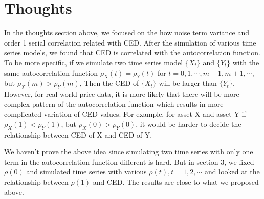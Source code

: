 \documentclass[11pt]{article}
\begin{document}
\section{Thoughts} %

In the thoughts section above, we focused on the how noise term variance and order 1 serial correlation related with CED. After the simulation of various time series models, we found that CED is correlated with the autocorrelation function. To be more specific, if we simulate two time series model $\{X_t\}$ and $\{Y_t\}$ with the same autocorrelation function $\rho_X(t) = \rho_Y(t)$ for $ t = 0, 1, \cdots, m-1, m+1, \cdots$, but $\rho_X(m) > \rho_Y(m)$, Then the CED of $\{X_t\}$ will be larger than $\{Y_t\}$. However, for real world price data, it is more likely that there will be more complex pattern of the autocorrelation function which results in more complicated variation of CED values. For example, for asset X and asset Y if $\rho_X(1) < \rho_Y(1)$, but $\rho_X(0) > \rho_Y(0)$, it would be harder to decide the relationship between CED of X and CED of Y.

We haven't prove the above idea since simulating two time series with only one term in the autocorrelation function different is hard. But in section 3, we fixed $\rho(0)$ and simulated time series with various $\rho(t), t = 1, 2, \cdots$ and looked at the relationship between $\rho(1)$ and CED. The results are close to what we proposed above. 
\end{document}
